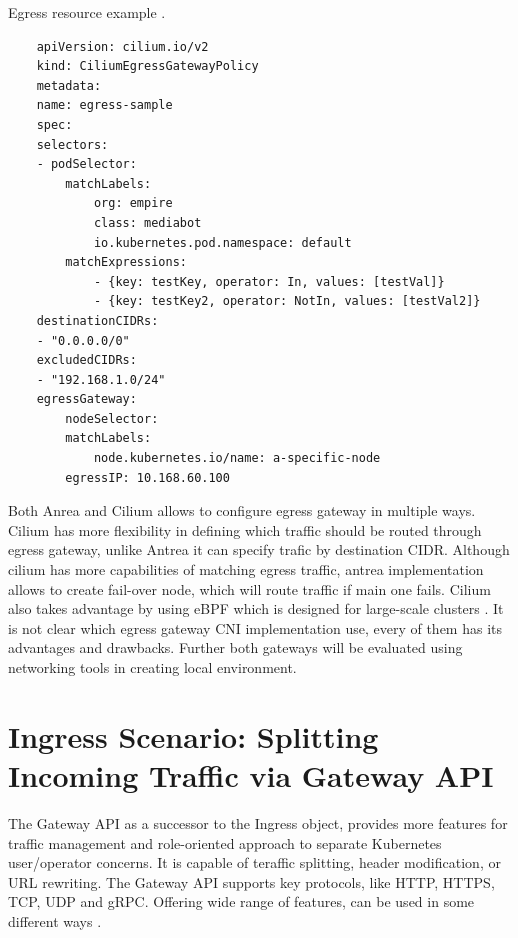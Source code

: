 \begin{listing}[htb]
    \centering
    \caption{Egress resource example \cite{AntreaEgressArch}.}
    \begin{verbatim}
    apiVersion: cilium.io/v2
    kind: CiliumEgressGatewayPolicy
    metadata:
    name: egress-sample
    spec:
    selectors:
    - podSelector:
        matchLabels:
            org: empire
            class: mediabot
            io.kubernetes.pod.namespace: default
        matchExpressions:
            - {key: testKey, operator: In, values: [testVal]}
            - {key: testKey2, operator: NotIn, values: [testVal2]}
    destinationCIDRs:
    - "0.0.0.0/0"
    excludedCIDRs:
    - "192.168.1.0/24"
    egressGateway:
        nodeSelector:
        matchLabels:
            node.kubernetes.io/name: a-specific-node
        egressIP: 10.168.60.100
    \end{verbatim}
    \label{lst:yamlCiliumEgressGatewayPolicy}
\end{listing}


Both Anrea and Cilium allows to configure egress gateway in multiple ways. Cilium has more flexibility in defining which traffic should be routed through egress gateway, unlike Antrea it can specify trafic by destination CIDR. Although cilium has more capabilities of matching egress traffic, antrea implementation allows to create fail-over node, which will route traffic if main one fails. Cilium also takes advantage by using eBPF which is designed for large-scale clusters \cite{CiliumOverview}. It is not clear which egress gateway CNI implementation use, every of them has its advantages and drawbacks. Further both gateways will be evaluated using networking tools in creating local environment.




\section{Ingress Scenario: Splitting Incoming Traffic via Gateway API}
\label{sec:ingress}

The Gateway API as a successor to the Ingress object, provides more features for traffic management and role-oriented approach to separate Kubernetes user/operator concerns. It is capable of teraffic splitting, header modification, or URL rewriting. The Gateway API supports key protocols, like HTTP, HTTPS, TCP, UDP and gRPC. Offering wide range of features, can be used in some different ways \cite{CiliumGatewayAPIBlog}.

